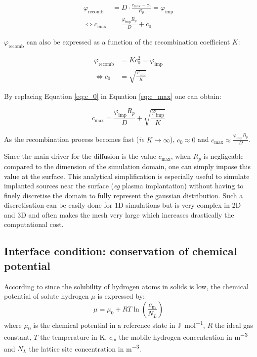 \begin{eqnarray}
    \varphi_\mathrm{recomb} &= D \cdot \frac{c_\mathrm{max}-c_{0}}{R_{p}} = \varphi_\mathrm{imp}\\
    \Leftrightarrow c_\mathrm{max} &= \frac{\varphi_\mathrm{imp} R_{p}}{D}+ c_0
    \label{eq:c_max}
\end{eqnarray}

$\varphi_\mathrm{recomb}$ can also be expressed as a function of the recombination coefficient $K$:

\begin{eqnarray}
    \varphi_\mathrm{recomb} &= K c_{0}^{2} = \varphi_\mathrm{imp}\\
    \Leftrightarrow c_{0} &= \sqrt{\frac{\varphi_\mathrm{imp}}{K}}
    \label{eq:c_0}
\end{eqnarray}

By replacing Equation \ref{eq:c_0} in Equation \ref{eq:c_max} one can obtain:

\begin{equation}
    c_\mathrm{max} = \frac{\varphi_\mathrm{imp} R_{p}}{D}+\sqrt{\frac{\varphi_\mathrm{imp}}{K}}
\end{equation}

As the recombination process becomes fast (\textit{ie} $K \rightarrow \infty$), $c_0 \approx 0$ and $c_\mathrm{max} \approx \frac{\varphi_\mathrm{imp} R_{p}}{D}$.

Since the main driver for the diffusion is the value $c_\mathrm{max}$, when $R_p$ is negligeable compared to the dimension of the simulation domain, one can simply impose this value at the surface.
This analytical simplification is especially useful to simulate implanted sources near the surface (\textit{eg} plasma implantation) without having to finely discretise the domain to fully represent the gaussian distribution.
Such a discretisation can be easily done for 1D simulations but is very complex in 2D and 3D and often makes the mesh very large which increases drastically the computational cost.


\subsection{Interface condition: conservation of chemical potential}
According to  since the solubility of hydrogen atoms in solids is low, the chemical potential of solute hydrogen $\mu$ is expressed by:
\begin{equation}
    \mu = \mu_0 + RT \ln\left( \frac{c_\mathrm{m}}{N_L}\right)
\end{equation}
where $\mu_0$ is the chemical potential in a reference state in \si{J.mol^{-1}}, $R$ the ideal gas constant, $T$ the temperature in \si{K}, $c_\mathrm{m}$ the mobile hydrogen concentration in \si{m^{-3}} and $N_L$ the lattice site concentration in \si{m^{-3}}.


